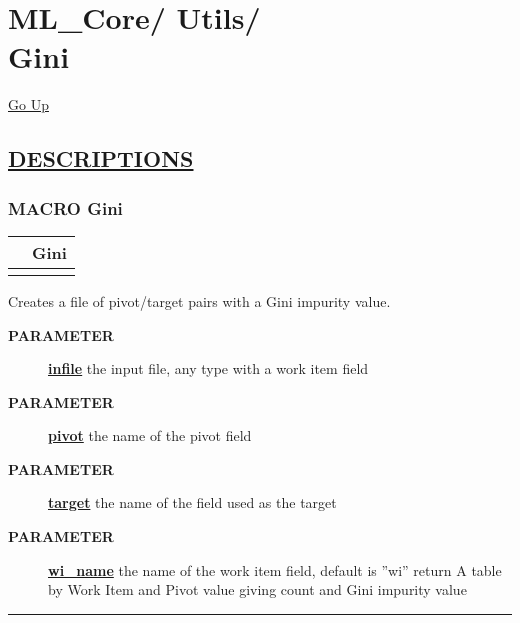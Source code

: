 \chapter*{\color{headfile}
{\large ML\_Core\slash\hspace{0pt}}
{\large Utils\slash\hspace{0pt}}
 \\
Gini
}
\hypertarget{ecldoc:toc:ML_Core.Utils.Gini}{}
\hyperlink{ecldoc:toc:root/ML_Core/Utils}{Go Up}


\section*{\underline{\textsf{DESCRIPTIONS}}}
\subsection*{\textsf{\colorbox{headtoc}{\color{white} MACRO}
Gini}}

\hypertarget{ecldoc:ml_core.utils.gini}{}

{\renewcommand{\arraystretch}{1.5}
\begin{tabularx}{\textwidth}{|>{\raggedright\arraybackslash}l|X|}
\hline
\hspace{0pt}\mytexttt{\color{red} } & \textbf{Gini} \\
\hline
\multicolumn{2}{|>{\raggedright\arraybackslash}X|}{\hspace{0pt}\mytexttt{\color{param} (infile, pivot, target, wi\_name='wi')}} \\
\hline
\end{tabularx}
}

\par
Creates a file of pivot/target pairs with a Gini impurity value.

\par
\begin{description}
\item [\colorbox{tagtype}{\color{white} \textbf{\textsf{PARAMETER}}}] \textbf{\underline{infile}} the input file, any type with a work item field
\item [\colorbox{tagtype}{\color{white} \textbf{\textsf{PARAMETER}}}] \textbf{\underline{pivot}} the name of the pivot field
\item [\colorbox{tagtype}{\color{white} \textbf{\textsf{PARAMETER}}}] \textbf{\underline{target}} the name of the field used as the target
\item [\colorbox{tagtype}{\color{white} \textbf{\textsf{PARAMETER}}}] \textbf{\underline{wi\_name}} the name of the work item field, default is ''wi'' return A table by Work Item and Pivot value giving count and Gini impurity value
\end{description}

\rule{\linewidth}{0.5pt}
